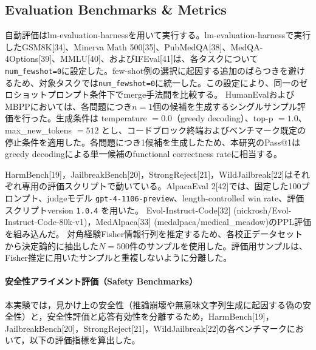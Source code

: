 \documentclass{article}
\begin{document}
\subsection{Evaluation Benchmarks \& Metrics}
\label{app:evaluation_benchmarks}
自動評価はlm-evaluation-harnessを用いて実行する。lm-evaluation-harnessで実行したGSM8K[34]、Minerva Math 500[35]、PubMedQA[38]、MedQA-4Options[39]、MMLU[40]、およびIFEval[41]は、各タスクについて\texttt{num\_fewshot=0}に設定した。few-shot例の選択に起因する追加のばらつきを避けるため、対象タスクでは\texttt{num\_fewshot=0}に統一した。この設定により、同一のゼロショットプロンプト条件下でmerge手法間を比較する。
HumanEvalおよびMBPPにおいては、各問題につき\(n=1\)個の候補を生成するシングルサンプル評価を行った。生成条件は temperature \(=0.0\)（greedy decoding）、top-p \(=1.0\)、max\_new\_tokens \(=512\) とし、コードブロック終端およびベンチマーク既定の停止条件を適用した。各問題につき1候補を生成したため、本研究のPass@1はgreedy decodingによる単一候補のfunctional correctness rateに相当する。

HarmBench[19]，JailbreakBench[20]，StrongReject[21]，WildJailbreak[22]はそれぞれ専用の評価スクリプトで動いている。AlpacaEval 2[42]では、固定した100プロンプト、judgeモデル \texttt{gpt-4-1106-preview}、length-controlled win rate、評価スクリプトversion \texttt{1.0.4} を用いた。
Evol-Instruct-Code[32] (nickrosh/Evol-Instruct-Code-80k-v1)，MedAlpaca[33] (medalpaca/medical\_meadow)のPPL評価を組み込んだ。
対角経験Fisher情報行列を推定するため、各校正データセットから決定論的に抽出した\(N=500\)件のサンプルを使用した。評価用サンプルは、Fisher推定に用いたサンプルと重複しないように分離した。

\paragraph{安全性アライメント評価（Safety Benchmarks）}
本実験では，見かけ上の安全性（推論崩壊や無意味文字列生成に起因する偽の安全性）と，安全性評価と応答有効性を分離するため，HarmBench[19]，JailbreakBench[20]，StrongReject[21]，WildJailbreak[22]の各ベンチマークにおいて，以下の評価指標を算出した。
\end{document}
